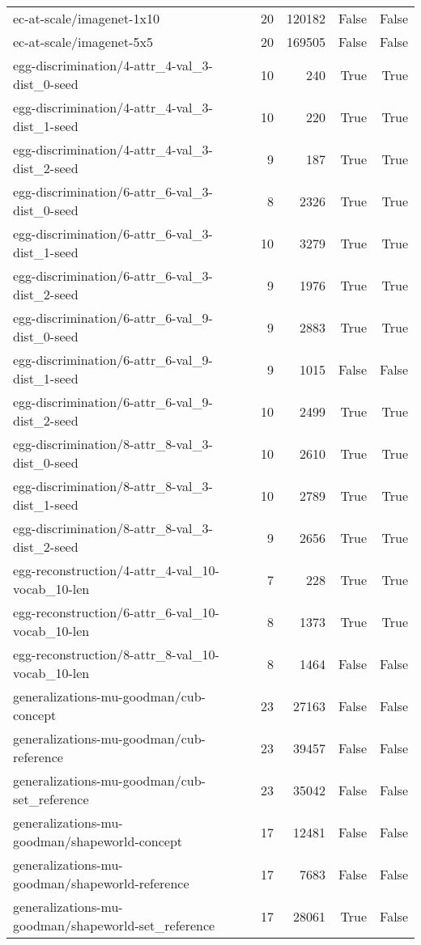\begin{tabular}{lrrrr}
ec-at-scale/imagenet-1x10 & 20 & 120182 & False & False \\
ec-at-scale/imagenet-5x5 & 20 & 169505 & False & False \\
egg-discrimination/4-attr\_4-val\_3-dist\_0-seed & 10 & 240 & True & True \\
egg-discrimination/4-attr\_4-val\_3-dist\_1-seed & 10 & 220 & True & True \\
egg-discrimination/4-attr\_4-val\_3-dist\_2-seed & 9 & 187 & True & True \\
egg-discrimination/6-attr\_6-val\_3-dist\_0-seed & 8 & 2326 & True & True \\
egg-discrimination/6-attr\_6-val\_3-dist\_1-seed & 10 & 3279 & True & True \\
egg-discrimination/6-attr\_6-val\_3-dist\_2-seed & 9 & 1976 & True & True \\
egg-discrimination/6-attr\_6-val\_9-dist\_0-seed & 9 & 2883 & True & True \\
egg-discrimination/6-attr\_6-val\_9-dist\_1-seed & 9 & 1015 & False & False \\
egg-discrimination/6-attr\_6-val\_9-dist\_2-seed & 10 & 2499 & True & True \\
egg-discrimination/8-attr\_8-val\_3-dist\_0-seed & 10 & 2610 & True & True \\
egg-discrimination/8-attr\_8-val\_3-dist\_1-seed & 10 & 2789 & True & True \\
egg-discrimination/8-attr\_8-val\_3-dist\_2-seed & 9 & 2656 & True & True \\
egg-reconstruction/4-attr\_4-val\_10-vocab\_10-len & 7 & 228 & True & True \\
egg-reconstruction/6-attr\_6-val\_10-vocab\_10-len & 8 & 1373 & True & True \\
egg-reconstruction/8-attr\_8-val\_10-vocab\_10-len & 8 & 1464 & False & False \\
generalizations-mu-goodman/cub-concept & 23 & 27163 & False & False \\
generalizations-mu-goodman/cub-reference & 23 & 39457 & False & False \\
generalizations-mu-goodman/cub-set\_reference & 23 & 35042 & False & False \\
generalizations-mu-goodman/shapeworld-concept & 17 & 12481 & False & False \\
generalizations-mu-goodman/shapeworld-reference & 17 & 7683 & False & False \\
generalizations-mu-goodman/shapeworld-set\_reference & 17 & 28061 & True & False \\

\end{tabular}
